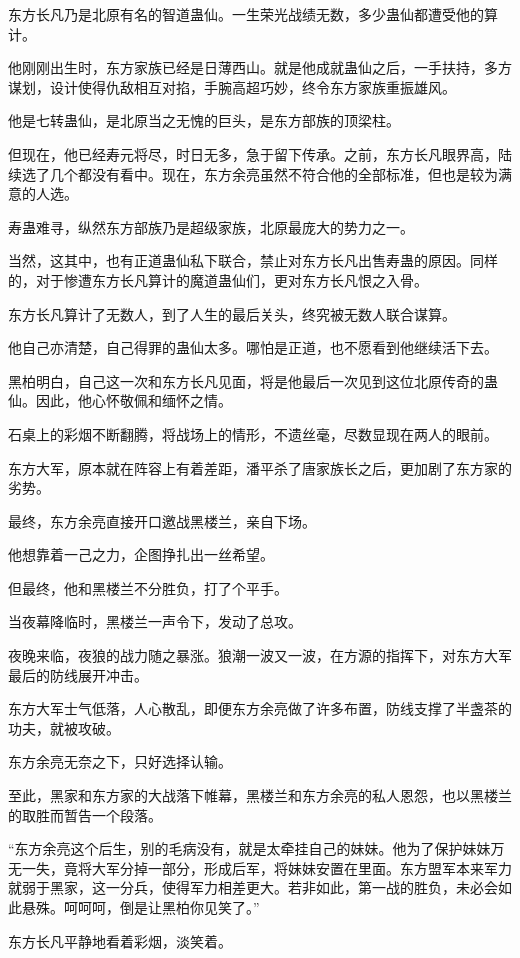 \begin{this_body}
东方长凡乃是北原有名的智道蛊仙。一生荣光战绩无数，多少蛊仙都遭受他的算计。

他刚刚出生时，东方家族已经是日薄西山。就是他成就蛊仙之后，一手扶持，多方谋划，设计使得仇敌相互对掐，手腕高超巧妙，终令东方家族重振雄风。

他是七转蛊仙，是北原当之无愧的巨头，是东方部族的顶梁柱。

但现在，他已经寿元将尽，时日无多，急于留下传承。之前，东方长凡眼界高，陆续选了几个都没有看中。现在，东方余亮虽然不符合他的全部标准，但也是较为满意的人选。

寿蛊难寻，纵然东方部族乃是超级家族，北原最庞大的势力之一。

当然，这其中，也有正道蛊仙私下联合，禁止对东方长凡出售寿蛊的原因。同样的，对于惨遭东方长凡算计的魔道蛊仙们，更对东方长凡恨之入骨。

东方长凡算计了无数人，到了人生的最后关头，终究被无数人联合谋算。

他自己亦清楚，自己得罪的蛊仙太多。哪怕是正道，也不愿看到他继续活下去。

黑柏明白，自己这一次和东方长凡见面，将是他最后一次见到这位北原传奇的蛊仙。因此，他心怀敬佩和缅怀之情。

石桌上的彩烟不断翻腾，将战场上的情形，不遗丝毫，尽数显现在两人的眼前。

东方大军，原本就在阵容上有着差距，潘平杀了唐家族长之后，更加剧了东方家的劣势。

最终，东方余亮直接开口邀战黑楼兰，亲自下场。

他想靠着一己之力，企图挣扎出一丝希望。

但最终，他和黑楼兰不分胜负，打了个平手。

当夜幕降临时，黑楼兰一声令下，发动了总攻。

夜晚来临，夜狼的战力随之暴涨。狼潮一波又一波，在方源的指挥下，对东方大军最后的防线展开冲击。

东方大军士气低落，人心散乱，即便东方余亮做了许多布置，防线支撑了半盏茶的功夫，就被攻破。

东方余亮无奈之下，只好选择认输。

至此，黑家和东方家的大战落下帷幕，黑楼兰和东方余亮的私人恩怨，也以黑楼兰的取胜而暂告一个段落。

“东方余亮这个后生，别的毛病没有，就是太牵挂自己的妹妹。他为了保护妹妹万无一失，竟将大军分掉一部分，形成后军，将妹妹安置在里面。东方盟军本来军力就弱于黑家，这一分兵，使得军力相差更大。若非如此，第一战的胜负，未必会如此悬殊。呵呵呵，倒是让黑柏你见笑了。”

东方长凡平静地看着彩烟，淡笑着。


\end{this_body}
